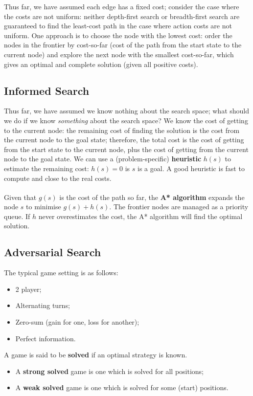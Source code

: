 \documentclass[a4paper,11pt]{article}
\begin{document}
Thus far, we have assumed each edge has a fixed cost; consider the case where the costs are not uniform:
neither depth-first search or breadth-first search are guaranteed to find the least-cost path in the case where action costs are not uniform.
One approach is to choose the node with the lowest cost: order the nodes in the frontier by cost-so-far (cost of the path from the start state to the current node) and explore the next node with the smallest cost-so-far, which gives an optimal and complete solution (given all positive costs).

\subsection{Informed Search}
Thus far, we have assumed we know nothing about the search space; what should we do if we know \textit{something} about the search space?
We know the cost of getting to the current node: the remaining cost of finding the solution is the cost from the current node to the goal state; therefore, the total cost is the cost of getting from the start state to the current node, plus the cost of getting from the current node to the goal state.
We can use a (problem-specific) \textbf{heuristic} $h(s)$ to estimate the remaining cost: $h(s) = 0$ is $s$ is a goal.
A good heuristic is fast to compute and close to the real costs.
\\\\
Given that $g(s)$ is the cost of the path so far, the \textbf{A* algorithm} expands the node $s$ to minimise $g(s) + h(s)$.
The frontier nodes are managed as a priority queue.
If $h$ never overestimates the cost, the A* algorithm will find the optimal solution.

\subsection{Adversarial Search}
The typical game setting is as follows:
\begin{itemize}
    \item   2 player;
    \item   Alternating turns;
    \item   Zero-sum (gain for one, loss for another);
    \item   Perfect information.
\end{itemize}

A game is said to be \textbf{solved} if an optimal strategy is known.
\begin{itemize}
    \item   A \textbf{strong solved} game is one which is solved for all positions;
    \item   A \textbf{weak solved} game is one which is solved for some (start) positions.
\end{itemize}
\end{document}
